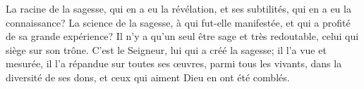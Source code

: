 La racine de la sagesse, qui en a eu la révélation,
	et ses subtilités, qui en a eu la connaissance?
La science de la sagesse, à qui fut-elle manifestée,
	et qui a profité de sa grande expérience?
Il n’y a qu’un seul être sage et très redoutable, celui qui siège sur son trône.
C’est le Seigneur, lui qui a créé la sagesse;
	il l’a vue et mesurée, il l’a répandue sur toutes ses œuvres,
	parmi tous les vivants, dans la diversité de ses dons,
	et ceux qui aiment Dieu en ont été comblés.
